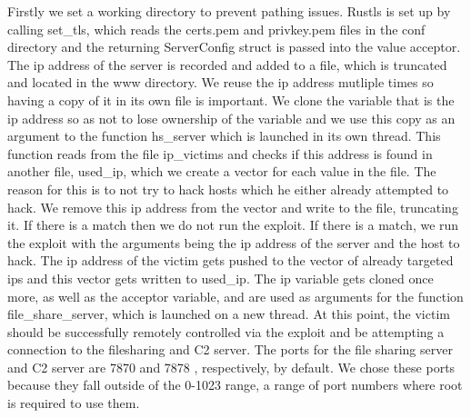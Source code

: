 \documentclass[../main.tex]{subfiles}
\begin{document}
Firstly we set a working directory to prevent pathing issues.
Rustls is set up by calling set_tls, which reads the certs.pem and privkey.pem files in the conf directory and the returning ServerConfig struct is passed into the value acceptor. 
The ip address of the server is recorded and added to a file, which is truncated and located in the www directory. We reuse the ip address mutliple times so having a copy of it in its own 
file is important. We clone
the variable that is the ip address so as not to lose ownership of the variable and we use this copy as an argument to the function hs\_server which is launched in its own thread.
This function reads from the file ip\_victims and checks if this address is found in another file, used\_ip, which we create a vector for each value in the file. The reason for this is 
to not try to hack hosts which he either already attempted to hack. We remove this ip address from the vector and write to the file, truncating it. If there is a match then we do not
run the exploit. If there is a match, we run the exploit with the arguments being the ip address of the server and the host to hack. The ip address of the victim gets pushed to the 
vector of already targeted ips and this vector gets written to used\_ip. The ip variable gets cloned once more, as well as the acceptor variable, and are used as arguments for the function file_share_server, which is launched on a new thread. 
At this point, the victim should be successfully remotely controlled via the exploit and be attempting a 
connection to the filesharing and C2 server. The ports for the file sharing server and C2 server are 7870 and 7878 , respectively, by default. We
chose these ports because they fall outside of the 0-1023 range, a range of port numbers where root is required to use them.

	\vspace{10pt}
\end{document}
